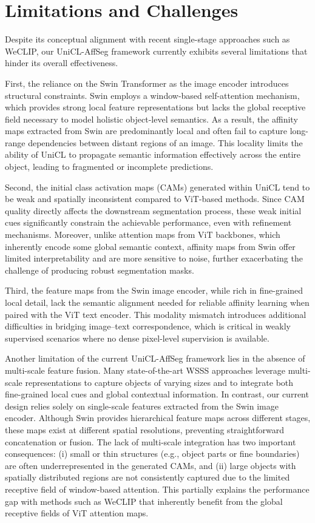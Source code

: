\section{Limitations and Challenges}
\label{sec:limitations_and_challenges}

Despite its conceptual alignment with recent single-stage approaches such as WeCLIP, our UniCL-AffSeg framework currently exhibits several limitations that hinder its overall effectiveness.  

First, the reliance on the Swin Transformer as the image encoder introduces structural constraints. Swin employs a window-based self-attention mechanism, which provides strong local feature representations but lacks the global receptive field necessary to model holistic object-level semantics. As a result, the affinity maps extracted from Swin are predominantly local and often fail to capture long-range dependencies between distant regions of an image. This locality limits the ability of UniCL to propagate semantic information effectively across the entire object, leading to fragmented or incomplete predictions.  

Second, the initial class activation maps (CAMs) generated within UniCL tend to be weak and spatially inconsistent compared to ViT-based methods. Since CAM quality directly affects the downstream segmentation process, these weak initial cues significantly constrain the achievable performance, even with refinement mechanisms. Moreover, unlike attention maps from ViT backbones, which inherently encode some global semantic context, affinity maps from Swin offer limited interpretability and are more sensitive to noise, further exacerbating the challenge of producing robust segmentation masks.  

Third, the feature maps from the Swin image encoder, while rich in fine-grained local detail, lack the semantic alignment needed for reliable affinity learning when paired with the ViT text encoder. This modality mismatch introduces additional difficulties in bridging image–text correspondence, which is critical in weakly supervised scenarios where no dense pixel-level supervision is available.  

Another limitation of the current UniCL-AffSeg framework lies in the absence of multi-scale feature fusion. Many state-of-the-art WSSS approaches leverage multi-scale representations to capture objects of varying sizes and to integrate both fine-grained local cues and global contextual information. In contrast, our current design relies solely on single-scale features extracted from the Swin image encoder. Although Swin provides hierarchical feature maps across different stages, these maps exist at different spatial resolutions, preventing straightforward concatenation or fusion. The lack of multi-scale integration has two important consequences: (i) small or thin structures (e.g., object parts or fine boundaries) are often underrepresented in the generated CAMs, and (ii) large objects with spatially distributed regions are not consistently captured due to the limited receptive field of window-based attention. This partially explains the performance gap with methods such as WeCLIP that inherently benefit from the global receptive fields of ViT attention maps.  

